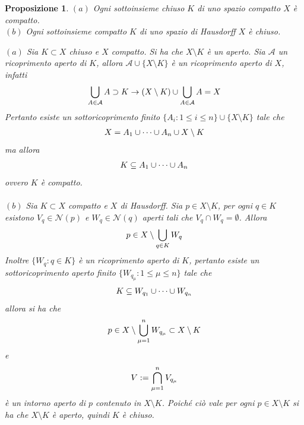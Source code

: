 \documentclass[oneside, 11pt]{amsbook}
\makeatletter
\newcommand{\0}{{(0)}}
\newcommand{\3}{{(3)}}
\theoremstyle{colonplain}
\newtheorem{prop}[thm]{Proposizione}
\theoremstyle{colondefinition}
\theoremstyle{colonremark}
\numberwithin{equation}{chapter}
\renewcommand{\proofname}{Dimostrazione}
\renewenvironment{proof}[1][\proofname]{\par
  \pushQED{\qed}%
  \normalfont \topsep6\p@\@plus6\p@\relax
  \trivlist
  \item[\hskip\labelsep\bfseries #1:]\ignorespaces
}{%
  \popQED\endtrivlist\@endpefalse
}
\makeatother
\begin{document}
\begin{prop}\label{ClosedInCompact}
$(a)$ Ogni sottoinsieme chiuso $K$ di uno spazio compatto $X$ è compatto. \\
$(b)$ Ogni sottoinsieme compatto $K$ di uno spazio di Hausdorff $X$ è chiuso.
\begin{proof}
$(a)$ Sia $K \subset X$ chiuso e $X$ compatto. Si ha che $X \setminus K$ è un aperto. Sia $\mathcal{A}$ un ricoprimento aperto di $K$, allora $\mathcal{A} \cup \{X \setminus K\}$ è un ricoprimento aperto di $X$, infatti
\begin{align}
    \bigcup_{A \in \mathcal{A}} A \supset K \rightarrow (X \setminus K) \cup \bigcup_{A \in \mathcal{A}} A = X \notag
\end{align}
Pertanto esiste un sottoricoprimento finito $\{A_i : 1 \leq i \leq n \} \cup \{ X \setminus K \}$ tale che
\begin{align}
    X = A_1 \cup \dots \cup A_n \cup X \setminus K \notag
\end{align}
ma allora
\begin{align}
    K \subseteq A_1 \cup \dots \cup A_n \notag
\end{align}
ovvero $K$ è compatto. \\ \\
$(b)$ Sia $K \subset X$ compatto e $X$ di Hausdorff. Sia $p \in X \setminus K$, per ogni $q \in K$ esistono $V_q \in \mathcal{N}(p)$ e $W_q \in \mathcal{N}(q)$ aperti tali che $V_q \cap W_q = \emptyset$. Allora
\begin{align}
    p \in X \setminus \bigcup_{q \in K} W_q \notag
\end{align}
Inoltre $\{ W_q : q \in K \}$ è un ricoprimento aperto di $K$, pertanto esiste un sottoricoprimento aperto finito $\{ W_{q_\mu} : 1 \leq \mu \leq n \}$ tale che
\begin{align}
    K \subseteq W_{q_1} \cup \dots \cup W_{q_n} \notag
\end{align}
allora si ha che
\begin{align}
    p \in X \setminus \bigcup_{\mu = 1}^n W_{q_\mu} \subset X \setminus K \notag
\end{align}
e
\begin{align}
    V := \bigcap_{\mu = 1}^n V_{q_\mu} \notag
\end{align}
è un intorno aperto di $p$ contenuto in $X \setminus K$. Poiché ciò vale per ogni $p \in X \setminus K$ si ha che $X \setminus K$ è aperto, quindi $K$ è chiuso.
\end{proof}
\end{prop}
\end{document}
